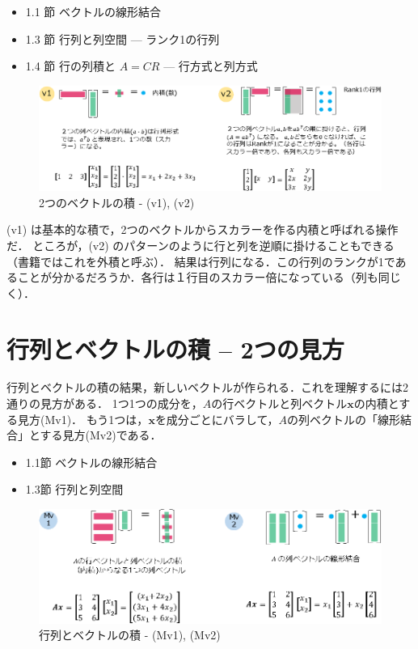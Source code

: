\documentclass[letterpaper]{article}
\begin{document}
\begin{itemize}
  \item 1.1 節 ベクトルの線形結合
  \item 1.3 節 行列と列空間 --- ランク1の行列
  \item 1.4 節 行の列積と $A=CR$ \; --- 行方式と列方式
\end{itemize} 


\begin{figure}[H]
  \centering
  \includegraphics[keepaspectratio, width=\linewidth]{VectorTimesVector-j.eps}
  \caption{2つのベクトルの積 - (v1), (v2)}
\end{figure}

(v1) は基本的な積で，2つのベクトルからスカラーを作る内積と呼ばれる操作だ．
ところが，(v2) のパターンのように行と列を逆順に掛けることもできる（書籍ではこれを外積と呼ぶ）．
結果は行列になる．この行列のランクが1であることが分かるだろうか．各行は１行目のスカラー倍になっている（列も同じく）．

\section{行列とベクトルの積 -- 2つの見方}

行列とベクトルの積の結果，新しいベクトルが作られる．これを理解するには2通りの見方がある．
1つ1つの成分を，$A$の行ベクトルと列ベクトル$\bm{x}$の内積とする見方(Mv1)．
もう1つは，$\bm{x}$を成分ごとにバラして，$A$の列ベクトルの「線形結合」とする見方(Mv2)である．

\begin{itemize}
  \item 1.1節 ベクトルの線形結合
  \item 1.3節 行列と列空間
\end{itemize} 

\begin{figure}[H]
  \includegraphics[keepaspectratio, width=\linewidth]{MatrixTimesVector-j.eps}
  \caption{行列とベクトルの積 - (Mv1), (Mv2)}
\end{figure}
\end{document}
